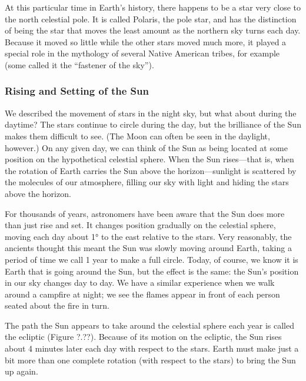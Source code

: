 \documentclass[../../main-astronomy.tex]{subfiles}
\begin{document}
\vspace{1em}

At this particular time in Earth's history, there happens to be a star very close to the north celestial pole. It is called Polaris, the pole star, and has the distinction of being the star that moves the least amount as the northern sky turns each day. Because it moved so little while the other stars moved much more, it played a special role in the mythology of several Native American tribes, for example (some called it the ``fastener of the sky'').

\subsubsection*{Rising and Setting of the Sun}

We described the movement of stars in the night sky, but what about during the daytime? The stars continue to circle during the day, but the brilliance of the Sun makes them difficult to see. (The Moon can often be seen in the daylight, however.) On any given day, we can think of the Sun as being located at some position on the hypothetical celestial sphere. When the Sun rises---that is, when the rotation of Earth carries the Sun above the horizon---sunlight is scattered by the molecules of our atmosphere, filling our sky with light and hiding the stars above the horizon.

\vspace{1em}

For thousands of years, astronomers have been aware that the Sun does more than just rise and set. It changes position gradually on the celestial sphere, moving each day about \ang{1} to the east relative to the stars. Very reasonably, the ancients thought this meant the Sun was slowly moving around Earth, taking a period of time we call 1 \gls{year} to make a full circle. Today, of course, we know it is Earth that is going around the Sun, but the effect is the same: the Sun's position in our sky changes day to day. We have a similar experience when we walk around a campfire at night; we see the flames appear in front of each person seated about the fire in turn.

\vspace{1em}

The path the Sun appears to take around the celestial sphere each year is called the \gls{ecliptic} (Figure ?.??). Because of its motion on the ecliptic, the Sun rises about 4 minutes later each day with respect to the stars. Earth must make just a bit more than one complete rotation (with respect to the stars) to bring the Sun up again.
\end{document}
